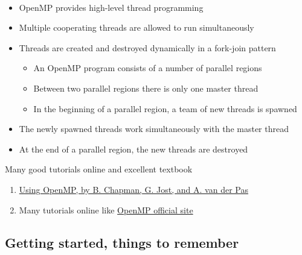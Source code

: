 \documentclass[%
oneside,                 %
final,                   %
10pt]{article}
\begin{document}
\paragraph{}
\begin{itemize}
\item OpenMP provides high-level thread programming

\item Multiple cooperating threads are allowed to run simultaneously

\item Threads are created and destroyed dynamically in a fork-join pattern
\begin{itemize}

   \item An OpenMP program consists of a number of parallel regions

   \item Between two parallel regions there is only one master thread

   \item In the beginning of a parallel region, a team of new threads is spawned

\end{itemize}

\noindent
  \item The newly spawned threads work simultaneously with the master thread

  \item At the end of a parallel region, the new threads are destroyed
\end{itemize}

\noindent
Many good tutorials online and excellent textbook
\begin{enumerate}
\item \href{{http://mitpress.mit.edu/books/using-openmp}}{Using OpenMP, by B. Chapman, G. Jost, and A. van der Pas}

\item Many tutorials online like \href{{http://www.openmp.org}}{OpenMP official site}
\end{enumerate}

\noindent



\subsection*{Getting started, things to remember}

\end{document}
